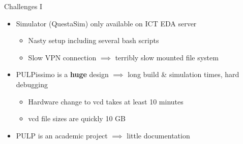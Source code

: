 \documentclass[aspectratio=169, nobackgroundmain]{beamer}
\begin{document}
\begin{frame}[fragile]{Challenges I}
  \begin{itemize}
      \item Simulator (QuestaSim) only available on ICT EDA server \begin{itemize}
        \item Nasty setup including several bash scripts
        \item Slow VPN connection $\implies$ terribly slow mounted file system
      \end{itemize}
      \item PULPissimo is a \textbf{huge} design $\implies$ long build \& simulation times, hard debugging \begin{itemize}
        \item Hardware change to vcd takes at least 10 minutes
        \item vcd file sizes are quickly 10 GB
      \end{itemize}
      \item PULP is an academic project $\implies$ little documentation
  \end{itemize}


\end{frame}
\end{document}
